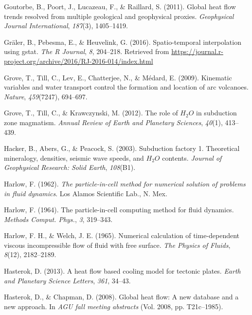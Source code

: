 \begin{CSLReferences}{1}{1}
\leavevmode{}%
Goutorbe, B., Poort, J., Lucazeau, F., \& Raillard, S. (2011). Global heat flow trends resolved from multiple geological and geophysical proxies. \emph{Geophysical Journal International}, \emph{187}(3), 1405--1419.

\leavevmode{}%
Gräler, B., Pebesma, E., \& Heuvelink, G. (2016). Spatio-temporal interpolation using gstat. \emph{The R Journal}, \emph{8}, 204--218. Retrieved from \url{https://journal.r-project.org/archive/2016/RJ-2016-014/index.html}

\leavevmode{}%
Grove, T., Till, C., Lev, E., Chatterjee, N., \& Médard, E. (2009). Kinematic variables and water transport control the formation and location of arc volcanoes. \emph{Nature}, \emph{459}(7247), 694--697.

\leavevmode{}%
Grove, T., Till, C., \& Krawczynski, M. (2012). The role of \(H_2O\) in subduction zone magmatism. \emph{Annual Review of Earth and Planetary Sciences}, \emph{40}(1), 413--439.

\leavevmode{}%
Hacker, B., Abers, G., \& Peacock, S. (2003). Subduction factory 1. Theoretical mineralogy, densities, seismic wave speeds, and \(H_2O\) contents. \emph{Journal of Geophysical Research: Solid Earth}, \emph{108}(B1).

\leavevmode{}%
Harlow, F. (1962). \emph{The particle-in-cell method for numerical solution of problems in fluid dynamics}. Los Alamos Scientific Lab., N. Mex.

\leavevmode{}%
Harlow, F. (1964). The particle-in-cell computing method for fluid dynamics. \emph{Methods Comput. Phys.}, \emph{3}, 319--343.

\leavevmode{}%
Harlow, F. H., \& Welch, J. E. (1965). Numerical calculation of time-dependent viscous incompressible flow of fluid with free surface. \emph{The Physics of Fluids}, \emph{8}(12), 2182--2189.

\leavevmode{}%
Hasterok, D. (2013). A heat flow based cooling model for tectonic plates. \emph{Earth and Planetary Science Letters}, \emph{361}, 34--43.

\leavevmode{}%
Hasterok, D., \& Chapman, D. (2008). Global heat flow: A new database and a new approach. In \emph{AGU fall meeting abstracts} (Vol. 2008, pp. T21c--1985).


\end{CSLReferences}
